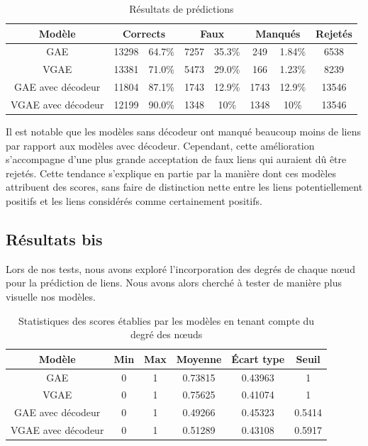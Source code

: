 \documentclass{article}
\begin{document}
\begin{table}[H]
    \centering
    \begin{tabular}{|c|c|c|c|c|c|c|c|}
        \hline
        Modèle & \multicolumn{2}{c|}{Corrects} & \multicolumn{2}{c|}{Faux} & \multicolumn{2}{c|}{Manqués} & Rejetés\\
        \hline
        GAE & 13298 & 64.7\% & 7257 & 35.3\% & 249 & 1.84\% & 6538\\
        VGAE & 13381 & 71.0\% & 5473 & 29.0\% & 166 & 1.23\% & 8239\\
        GAE avec décodeur & 11804 & 87.1\% & 1743 & 12.9\% & 1743 & 12.9\% & 13546\\
        VGAE avec décodeur & 12199 & 90.0\% & 1348 & 10\% & 1348 & 10\% & 13546\\
         \hline
    \end{tabular}
    \caption{Résultats de prédictions}
    \label{tab:resultats_reconstruction}
\end{table}

Il est notable que les modèles sans décodeur ont manqué beaucoup moins de liens par rapport aux modèles avec décodeur. Cependant, cette amélioration s'accompagne d'une plus grande acceptation de faux liens qui auraient dû être rejetés. Cette tendance s'explique en partie par la manière dont ces modèles attribuent des scores, sans faire de distinction nette entre les liens potentiellement positifs et les liens considérés comme certainement positifs.

\subsection{Résultats bis}
Lors de nos tests, nous avons exploré l'incorporation des degrés de chaque nœud pour la prédiction de liens. Nous avons alors cherché à tester de manière plus visuelle nos modèles.

\begin{table}[H]
    \centering
    \begin{tabular}{|c|c|c|c|c|c|}
        \hline
        Modèle & Min & Max & Moyenne & Écart type & Seuil\\
        \hline
        GAE & 0 & 1 & 0.73815 & 0.43963 & 1\\
        VGAE & 0 & 1 & 0.75625 & 0.41074 & 1\\
        GAE avec décodeur & 0 & 1 & 0.49266 & 0.45323 & 0.5414\\
        VGAE avec décodeur & 0 & 1 & 0.51289 & 0.43108 & 0.5917\\
        \hline
    \end{tabular}
    \caption{Statistiques des scores établies par les modèles en tenant compte du degré des nœuds}
    \label{tab:statistiques_scores_avec_degre}
\end{table}
\end{document}
